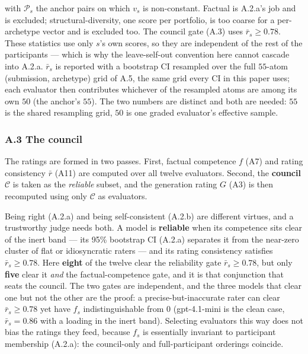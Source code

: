 with \(\mathcal P_s\) the anchor pairs on which \(v_s\) is non-constant. Factual is A.2.a's job and is excluded; structural-diversity, one score per portfolio, is too coarse for a per-archetype vector and is excluded too. The council gate (A.3) uses \(\bar r_s\ge0.78\). These statistics use only \(s\)'s own scores, so they are independent of the rest of the participants --- which is why the leave-self-out convention here cannot cascade into A.2.a. \(\bar r_s\) is reported with a bootstrap CI resampled over the full \(55\)-atom (submission, archetype) grid of A.5, the same grid every CI in this paper uses; each evaluator then contributes whichever of the resampled atoms are among its own \(50\) (the anchor's \(55\)). The two numbers are distinct and both are needed: \(55\) is the shared resampling grid, \(50\) is one graded evaluator's effective sample.

\subsubsection{A.3 The council}\label{a.3-the-council}

The ratings are formed in two passes. First, factual competence \(f\) (A7) and rating consistency \(\bar r\) (A11) are computed over all twelve evaluators. Second, the \textbf{council} \(\mathcal{C}\) is taken as the \emph{reliable} subset, and the generation rating \(G\) (A3) is then recomputed using only \(\mathcal{C}\) as evaluators.

Being right (A.2.a) and being self-consistent (A.2.b) are different virtues, and a trustworthy judge needs both. A model is \textbf{reliable} when its competence sits clear of the inert band --- its 95\% bootstrap CI (A.2.a) separates it from the near-zero cluster of flat or idiosyncratic raters --- and its rating consistency satisfies \(\bar r_s\ge0.78\). Here \textbf{eight} of the twelve clear the reliability gate \(\bar r_s\ge0.78\), but only \textbf{five} clear it \emph{and} the factual-competence gate, and it is that conjunction that seats the council. The two gates are independent, and the three models that clear one but not the other are the proof: a precise-but-inaccurate rater can clear \(\bar r_s\ge0.78\) yet have \(f_s\) indistinguishable from \(0\) (gpt-4.1-mini is the clean case, \(\bar r_s=0.86\) with a loading in the inert band). Selecting evaluators this way does not bias the ratings they feed, because \(f_s\) is essentially invariant to participant membership (A.2.a): the council-only and full-participant orderings coincide.

